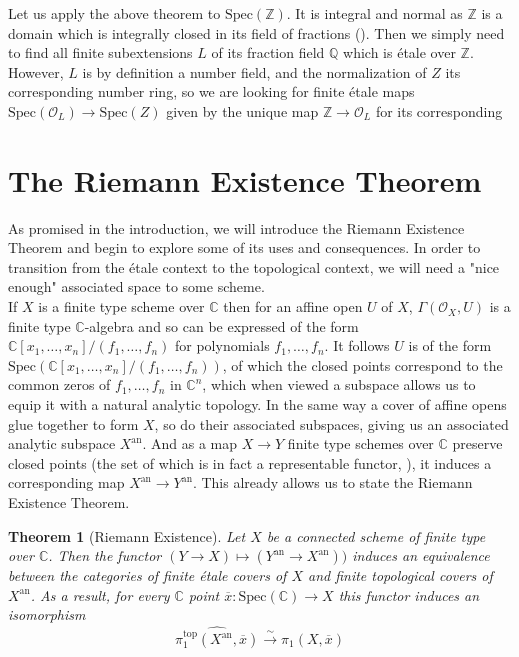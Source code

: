 \documentclass{article}
\newtheorem{theorem}{Theorem}[section]
\theoremstyle{definition}
\theoremstyle{remark}
\theoremstyle{plain}
\newcommand{\C}{\mathbb{C}}
\newcommand{\Z}{\mathbb{Z}}
\newcommand{\Q}{\mathbb{Q}}
\newcommand{\mc}[1]{\mathcal{#1}}
\begin{document}
Let us apply the above theorem to $\text{Spec}(\Z)$.
It is integral and normal as $\Z$ is a domain which is integrally closed in its field of fractions (). 
Then we simply need to find all finite subextensions $L$ of its fraction field $\Q$ which is \'etale over $\Z$.
However, $L$ is by definition a number field, and the normalization of $Z$ its corresponding number ring, so we are looking for finite \'etale maps $\text{Spec}(\mc{O}_L) \to \text{Spec}(Z)$ given by the unique map $\Z \to \mc{O}_L $
for its corresponding 


\section{The Riemann Existence Theorem}

As promised in the introduction, we will introduce the Riemann Existence Theorem and begin to explore some of its uses and consequences.
In order to transition from the \'etale context to the topological context, we will need a "nice enough" associated space to some scheme.\\

\indent If $X$ is a finite type scheme over $\C$ then for an affine open $U$ of $X$, $\Gamma(\mc{O}_X, U)$ is a finite type $\C$-algebra and so can be expressed of the form $\C[x_1, \dots, x_n]/(f_1, \dots, f_n)$ for polynomials $f_1, \dots, f_n$.
It follows $U$ is of the form $\text{Spec}(\C[x_1, \dots, x_n]/(f_1, \dots, f_n))$, of which the closed points correspond to the common zeros of $f_1, \dots, f_n$ in $\C^n$, which when viewed a subspace allows us to equip it with a natural analytic topology.
In the same way a cover of affine opens glue together to form $X$, so do their associated subspaces, giving us an associated analytic subspace $X^{\text{an}}$.
And as a map $X \to Y$ finite type schemes over $\C$ preserve closed points (the set of which is in fact a representable functor, ), it induces a corresponding map $X^{\text{an}} \to Y^{\text{an}}$.
This already allows us to state the Riemann Existence Theorem.


\begin{theorem}[Riemann Existence]
	Let $X$ be a connected scheme of finite type over $\C$.
	Then the functor $(Y \to X) \mapsto (Y^{\text{an}} \to X^{\text{an}}))$ induces an equivalence between the categories of finite \'etale covers of $X$ and finite topological covers of $X^{\text{an}}$.
	As a result, for every $\C$ point $\overline{x}: \text{Spec}(\C) \to X$ this functor induces an isomorphism
	\[\widehat{\pi_1^{\text{top}}(X^{\text{an}}, \overline{x})} \xrightarrow{\sim} \pi_1(X, \overline{x})\]
\end{theorem}
\end{document}
